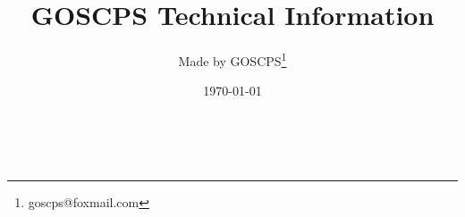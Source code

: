 \documentclass[UTF-8,twoside,a4paper,draft,titlepage]{ctexbook}
\begin{document}
\frontmatter
\title{GOSCPS Technical Information} 
\author{Made by GOSCPS\thanks{goscps@foxmail.com}}
\date{\today}
\maketitle
\mainmatter

\backmatter

\end{document}
